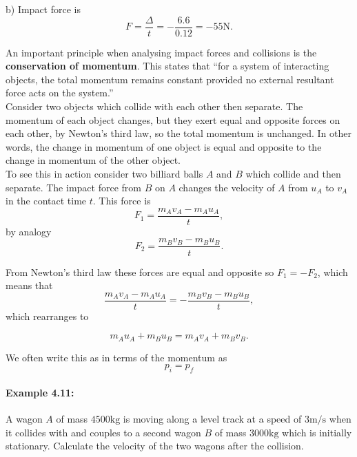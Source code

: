 b) Impact force is
\begin{equation*}
F=\frac{\Delta}{t}=-\frac{6.6}{0.12}=-55\text{N}.
\end{equation*}

An important principle when analysing impact forces and collisions is the \textbf{conservation of momentum}. This states that ``for a system of interacting objects, the total momentum remains constant provided no external resultant force acts on the system.''\\

Consider two objects which collide with each other then separate. The momentum of each object changes, but they exert equal and opposite forces on each other, by Newton's third law, so the total momentum is unchanged. In other words, the change in momentum of one object is equal and opposite to the change in momentum of the other object. \\

To see this in action consider two billiard balls $A$ and $B$ which collide and then separate. The impact force from $B$ on $A$ changes the velocity of $A$ from $u_{A}$ to $v_{A}$ in the contact time $t$. This force is
\begin{equation*}
F_{1}=\frac{m_{A}v_{A}-m_{A}u_{A}}{t},
\end{equation*}
by analogy
\begin{equation*}
F_{2}=\frac{m_{B}v_{B}-m_{B}u_{B}}{t}.
\end{equation*}

From Newton's third law these forces are equal and opposite so $F_{1}=-F_{2}$, which means that
\begin{equation*}
\frac{m_{A}v_{A}-m_{A}u_{A}}{t}=-\frac{m_{B}v_{B}-m_{B}u_{B}}{t},
\end{equation*}
which rearranges to

\begin{equation*}
m_{A}u_{A}+m_{B}u_{B}=m_{A}v_{A}+m_{B}v_{B}.
\end{equation*}

We often write this as in terms of the momentum as
\begin{equation}
p_{i}=p_{f}
\label{eq: conservation of momentum}
\end{equation}

\paragraph{Example 4.11:} A wagon $A$ of mass $4500\text{kg}$ is moving along a level track at a speed of $3\text{m/s}$ when it collides with and couples to a second wagon $B$ of mass $3000\text{kg}$ which is initially stationary. Calculate the velocity of the two wagons after the collision.\\

